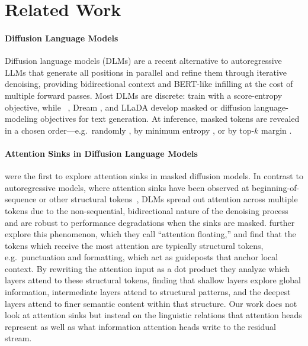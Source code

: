 \documentclass{article} %
\begin{document}
\section{Related Work}
\paragraph{Diffusion Language Models}
Diffusion language models (DLMs) are a recent alternative to autoregressive LLMs \citep{brownLanguageModelsAre2020,touvronLLaMAOpenEfficient2023} that generate all positions in parallel and refine them through iterative denoising, providing bidirectional context and BERT-like infilling \citep{liSurveyDiffusionLanguage2025,devlinBERTPretrainingDeep2019} at the cost of multiple forward passes. Most DLMs are discrete: \citet{louDiscreteDiffusionModeling2024} train with a score-entropy objective, while ~\citep{sahooSimpleEffectiveMasked2024}, Dream \citep{yeDream7BDiffusion2025}, and LLaDA \citep{nieLargeLanguageDiffusion} develop masked or diffusion language-modeling objectives for text generation. At inference, masked tokens are revealed in a chosen order---e.g.\ randomly \citep{austinStructuredDenoisingDiffusion2023}, by minimum entropy \citep{yeDream7BDiffusion2025}, or by top-$k$ margin \citep{kimTrainWorstPlan}.


\paragraph{Attention Sinks in Diffusion Language Models}
\citet{DBLP:journals/corr/abs-2510-15731} were the first to explore attention sinks in masked diffusion models. In contrast to autoregressive models, where attention sinks have been observed at beginning-of-sequence or other structural tokens~\citep{xiaoEfficientStreamingLanguage2024,darcetVisionTransformersNeed2024,guWhenAttentionSink2025}, DLMs spread out attention across multiple tokens due to the non-sequential, bidirectional nature of the denoising process and are robust to performance degradations when the sinks are masked. \citet{dai2026revealingattentionfloatingmechanism} further explore this phenomenon, which they call ``attention floating,'' and find that the tokens which receive the most attention are typically structural tokens, e.g.\ punctuation and formatting, which act as guideposts that anchor local context. By rewriting the attention input as a dot product they analyze which layers attend to these structural tokens, finding that shallow layers explore global information, intermediate layers attend to structural patterns, and the deepest layers attend to finer semantic content within that structure. Our work does not look at attention sinks but instead on the linguistic relations that attention heads represent as well as what information attention heads write to the residual stream.
\end{document}
